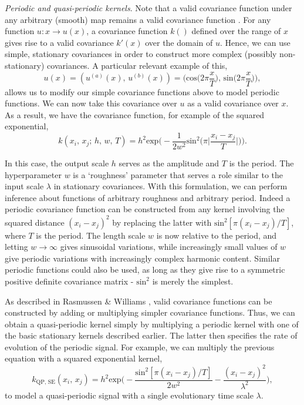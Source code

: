          \textit{Periodic and quasi-periodic kernels}. Note that a valid covariance function under any arbitrary (smooth) map remains a valid covariance function \cite{Roberts2013}. For any function \(u: x \to u(x)\), a covariance function \(k()\) defined over the range of \(x\) gives rise to a valid covariance \(k'(x)\) over the domain of \(u\). Hence, we can use simple, stationary covariances in order to construct more complex (possibly non-stationary) covariances. A particular relevant example of this, \[u(x) = (u^{(a)}(x),\, u^{(b)}(x)) = \bigg( \text{cos}\Big(2\pi\frac{x}{T} \Big),\, \text{sin}\Big(2\pi\frac{x}{T}\Big) \bigg),\] allows us to modify our simple covariance functions above to model periodic functions. We can now take this covariance over \(u\) as a valid covariance over \(x\). As a result, we have the covariance function, for example of the squared exponential, \[k(x_{i},\, x_{j};\, h,\, w,\, T) = h^2 \text{exp}\bigg( -\frac{1}{2w^2} \text{sin}^2\Big( \pi\Big|\frac{x_{i} - x_{j}}{T}\Big| \Big)\bigg).\]
         
         In this case, the output scale \(h\) serves as the amplitude and \(T\) is the period. The hyperparameter \(w\) is a `roughness' parameter that serves a role similar to the input scale \(\lambda\) in stationary covariances. With this formulation, we can perform inference about functions of arbitrary roughness and arbitrary period. Indeed a periodic covariance function can be constructed from any kernel involving the squared distance \((x_{i} - x_{j})^2\) by replacing the latter with \(\text{sin}^2[\pi(x_{i} - x_{j})/T]\), where \(T\) is the period. The length scale \(w\) is now relative to the period, and letting \(w \to \infty\) gives sinusoidal variations, while increasingly small values of \(w\) give periodic variations with increasingly complex harmonic content. Similar periodic functions could also be used, as long as they give rise to a symmetric positive definite covariance matrix - \(\text{sin}^2\) is merely the simplest.

         As described in Rasmussen \& Williams \cite{Rasmussen2006}, valid covariance functions can be constructed by adding or multiplying simpler covariance functions. Thus, we can obtain a quasi-periodic kernel simply by multiplying a periodic kernel with one of the basic stationary kernels described earlier. The latter then specifies the rate of evolution of the periodic signal. For example, we can multiply the previous equation with a squared exponential kernel, \[k_{\text{QP, SE}}(x_{i},\, x_{j}) = h^2 \text{exp}\bigg( -\frac{\text{sin}^2[ \pi(x_{i} - x_{j})/{T}]}{2w^2} - \frac{(x_{i} - x_{j})^2}{\lambda^2} \bigg),\] to model a quasi-periodic signal with a single evolutionary time scale \(\lambda\).

